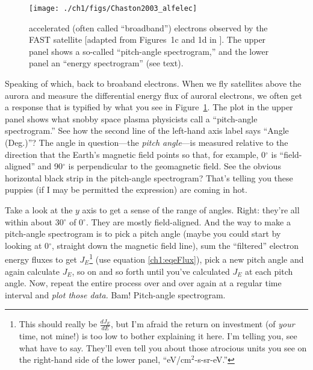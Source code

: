 
\begin{figure}
  \centering
  \noindent\texttt{[image: ./ch1/figs/Chaston2003\_alfelec]}
  \caption[\Alfically accelerated (broadband) electrons]{\Alfically
    accelerated (often called ``broadband'') electrons observed by
    the FAST satellite [adapted from Figures~1c and 1d in
    \citealp{Chaston2003a}]. The upper panel shows a so-called
    ``pitch-angle spectrogram,'' and the lower panel an ``energy
    spectrogram'' (see text).}
  \label{ch1:FigAlfElec}
\end{figure}


Speaking of which, back to broaband electrons. When we fly satellites
above the aurora and measure the differential energy flux of auroral
electrons, we often get a response that is typified by what you see in
Figure~\ref{ch1:FigAlfElec}. The plot in the upper panel shows what
snobby space plasma physicists call a ``pitch-angle spectrogram.''
See how the second line of the left-hand axis label says ``Angle
(Deg.)''?  The angle in question---the \emph{pitch angle}---is
measured relative to the direction that the Earth's magnetic field
points so that, for example, 0$^\circ$ is ``field-aligned'' and
90$^\circ$ is perpendicular to the geomagnetic field. See the obvious
horizontal black strip in the pitch-angle spectrogram? That's telling
you these puppies (if I may be permitted the expression) are coming in
hot.

Take a look at the $y$ axis to get a sense of the range of
angles. Right: they're all within about 30$^\circ$ of 0$^\circ$. They
are mostly field-aligned. And the way to make a pitch-angle
spectrogram is to pick a pitch angle (maybe you could start by looking
at 0$^\circ$, straight down the magnetic field line), sum the
``filtered'' electron energy fluxes to get $J_E$\footnote{This should
  really be $\frac{dJ_E}{dE}$, but I'm afraid the return on investment
  (of \emph{your} time, not mine!) is too low to bother explaining it
  here. I'm telling you, see what \citet{Bruno2013} have to
  say. They'll even tell you about those atrocious units you see on
  the right-hand side of the lower panel, ``eV/cm$^2$-s-sr-eV.''} (use
equation \ref{ch1:eqeFlux}), pick a new pitch angle and again
calculate $J_E$, so on and so forth until you've calculated $J_E$ at
each pitch angle. Now, repeat the entire process over and over again
at a regular time interval and \emph{plot those data.} Bam!
Pitch-angle spectrogram.

